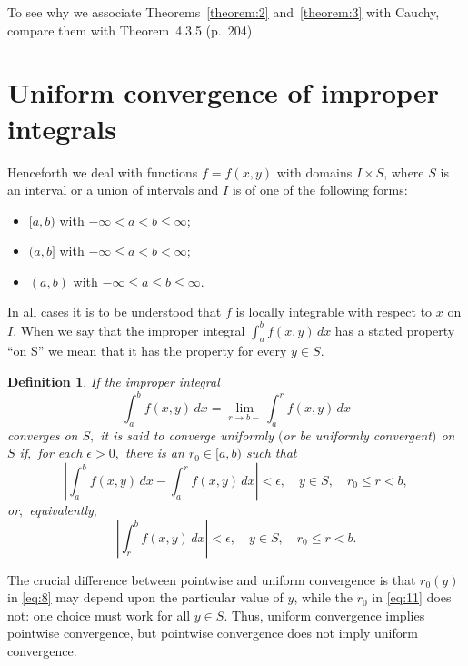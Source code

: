 \documentclass{article}
\newtheorem{definition}{Definition}
\begin{document}
To see why we associate Theorems~\ref{theorem:2} and~\ref{theorem:3} with
Cauchy, compare them with Theorem~4.3.5 (p.~204)

\section{Uniform convergence of improper integrals}\label{section:uniform}
\medskip

Henceforth we deal with functions $f=f(x,y)$  with domains
 $I\times S$, where $S$ is an interval or a union of intervals and   $I$ is
of one of the following forms:
\begin{itemize}
\item  $[a,b)$ with $-\infty<a<b\le \infty$;
\item $(a,b]$ with $-\infty\le a<b< \infty$;
\item   $(a,b)$ with $-\infty\le a\le b\le \infty$.
\end{itemize}
In all cases it is to be understood that $f$  is locally integrable with
respect to $x$ on  $I$.
 When we say that the
improper integral $\int_{a}^{b}f(x,y)\,dx$  has a stated property ``on
S'' we mean that it has the property for every $y\in S$.

\begin{definition}  \label{definition:1}
If the improper integral
\begin{equation} \label{eq:10}
\int_{a}^{b}f(x,y)\,dx=\lim_{r\to b-}\int_{a}^{r}f(x,y)\,dx
\end{equation}
converges on $S,$   it
 is said to converge
uniformly $($or be uniformly convergent$)$  on $S$ if$,$  for each
$\epsilon>0,$ there is an
$r_{0} \in [a,b)$
  such that
$$
\left|\int_{a}^{b}f(x,y)\,dx-\int_{a}^{r}f(x,y)\,dx\right|
< \epsilon,\quad  y\in S, \quad  r_{0}\le r<b,
$$
or$,$ equivalently$,$
\begin{equation} \label{eq:11}
\left|\int_{r}^{b}f(x,y)\,dx\right|< \epsilon, \quad
y\in S,\quad    r_{0}\le r<b.
\end{equation}
\end{definition}



The crucial difference between pointwise and uniform convergence is that
$r_{0}(y)$  in \eqref{eq:8} may depend upon the particular value of $y$,
while the
$r_{0}$ in \eqref{eq:11} does not: one choice must work for all $y\in S$.
Thus, uniform convergence
implies pointwise convergence, but pointwise convergence does not imply
uniform convergence.
\end{document}

